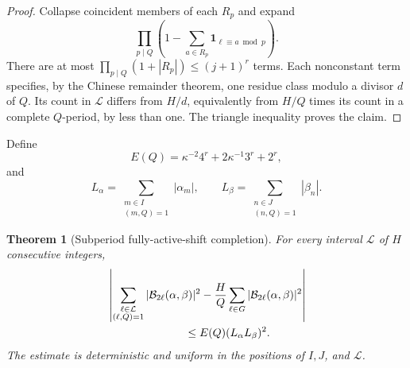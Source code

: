 \documentclass[11pt]{article}
\newtheorem{theorem}{Theorem}[section]
\theoremstyle{definition}
\theoremstyle{remark}
\newcommand{\one}{\mathbf 1}
\newcommand{\cB}{\mathcal B}
\newcommand{\cL}{\mathcal L}
\begin{document}
\begin{proof}
Collapse coincident members of each $R_p$ and expand
\[
 \prod_{p\mid Q}\left(1-
 \sum_{a\in R_p}\one_{\ell\equiv a\bmod p}\right).
\]
There are at most $\prod_{p\mid Q}(1+|R_p|)\le(j+1)^r$ terms.  Each nonconstant term specifies, by the Chinese remainder theorem, one residue class modulo a divisor $d$ of $Q$.  Its count in $\cL$ differs from $H/d$, equivalently from $H/Q$ times its count in a complete $Q$-period, by less than one.  The triangle inequality proves the claim.
\end{proof}

Define
\begin{equation}\label{eq:completion-cost}
 E(Q)=\kappa^{-2}4^r+2\kappa^{-1}3^r+2^r,
\end{equation}
and
\begin{equation}\label{eq:l1-box-coefficients}
 L_\alpha=\sum_{\substack{m\in I\\(m,Q)=1}}|\alpha_m|,
 \qquad
 L_\beta=\sum_{\substack{n\in J\\(n,Q)=1}}|\beta_n|.
\end{equation}

\begin{theorem}[Subperiod fully-active-shift completion]\label{thm:short-shift-completion}
For every interval $\cL$ of $H$ consecutive integers,
\begin{align}
 &\left|
 \sum_{\substack{\ell\in\cL\\(\ell,Q)=1}}
 |\cB_{2\ell}(\alpha,\beta)|^2
 -\frac HQ\sum_{\ell\in G}|\cB_{2\ell}(\alpha,\beta)|^2
 \right|\notag\\
 &\hspace{7em}\le E(Q)(L_\alpha L_\beta)^2.\label{eq:short-shift-completion}
\end{align}
The estimate is deterministic and uniform in the positions of $I,J$, and $\cL$.
\end{theorem}
\end{document}
